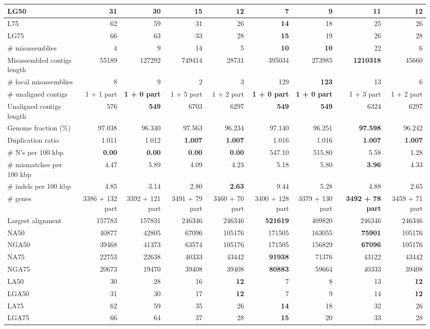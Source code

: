 \documentclass[12pt,a4paper]{article}
\begin{document}
\begin{table}[ht]
\begin{center}
\begin{tabular}{|l*{8}{|r}|}
LG50 & 31 & 30 & 15 & 12 & 7 & 9 & {\bf 11} & 12 \\ \hline
L75 & 62 & 59 & 31 & 26 & {\bf 14} & 18 & 25 & 26 \\ \hline
LG75 & 66 & 63 & 33 & 28 & {\bf 15} & 19 & 26 & 28 \\ \hline
\# misassemblies & 4 & 9 & 14 & 5 & {\bf 10} & {\bf 10} & 22 & 6 \\ \hline
Misassembled contigs length & 55189 & 127292 & 749414 & 28731 & 395034 & 273985 & {\bf 1210318} & 45660 \\ \hline
\# local misassemblies & 8 & 9 & 2 & 3 & 129 & {\bf 123} & 13 & 6 \\ \hline
\# unaligned contigs & 1 + 1 part & {\bf 1 + 0 part} & 1 + 5 part & 1 + 2 part & {\bf 1 + 0 part} & {\bf 1 + 0 part} & 1 + 3 part & 1 + 2 part \\ \hline
Unaligned contigs length & 576 & {\bf 549} & 6703 & 6297 & {\bf 549} & {\bf 549} & 6324 & 6297 \\ \hline
Genome fraction (\%) & 97.038 & 96.340 & 97.563 & 96.234 & 97.140 & 96.251 & {\bf 97.598} & 96.242 \\ \hline
Duplication ratio & 1.011 & 1.012 & {\bf 1.007} & {\bf 1.007} & 1.016 & 1.016 & {\bf 1.007} & {\bf 1.007} \\ \hline
\# N's per 100 kbp & {\bf 0.00} & {\bf 0.00} & {\bf 0.00} & {\bf 0.00} & 547.10 & 515.80 & 5.58 & 1.28 \\ \hline
\# mismatches per 100 kbp & 4.47 & 5.89 & 4.09 & 4.23 & 5.18 & 5.80 & {\bf 3.96} & 4.33 \\ \hline
\# indels per 100 kbp & 4.85 & 3.14 & 2.80 & {\bf 2.63} & 9.44 & 5.28 & 4.88 & 2.65 \\ \hline
\# genes & 3386 + 132 part & 3392 + 121 part & 3491 + 79 part & 3460 + 70 part & 3400 + 128 part & 3379 + 130 part & {\bf 3492 + 78 part} & 3459 + 71 part \\ \hline
Largest alignment & 157783 & 157831 & 246346 & 246346 & {\bf 521619} & 409820 & 246346 & 246346 \\ \hline
NA50 & 40877 & 42805 & 67096 & 105176 & 171505 & 163055 & {\bf 75901} & 105176 \\ \hline
NGA50 & 39468 & 41373 & 63574 & 105176 & 171505 & 156829 & {\bf 67096} & 105176 \\ \hline
NA75 & 22753 & 22638 & 40333 & 43442 & {\bf 91938} & 71376 & 43122 & 43442 \\ \hline
NGA75 & 20673 & 19470 & 39408 & 39408 & {\bf 80883} & 59664 & 40333 & 39408 \\ \hline
LA50 & 30 & 28 & 16 & {\bf 12} & 7 & 8 & 13 & {\bf 12} \\ \hline
LGA50 & 31 & 30 & 17 & {\bf 12} & 7 & 9 & 14 & {\bf 12} \\ \hline
LA75 & 62 & 59 & 35 & 26 & {\bf 14} & 18 & 32 & 26 \\ \hline
LGA75 & 66 & 64 & 37 & 28 & {\bf 15} & 20 & 33 & 28 \\ \hline
\end{tabular}
\end{center}
\end{table}
\end{document}
